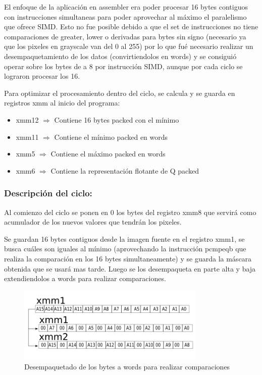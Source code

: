 El enfoque de la aplicación en assembler era poder procesar 16 bytes contiguos con instrucciones simultaneas para poder aprovechar al máximo el paralelismo que ofrece SIMD. Esto no fue posible debido a que el set de instrucciones no tiene comparaciones de greater, lower o derivadas para bytes sin signo (necesario ya que los pixeles en grayscale van del 0 al 255) por lo que fué necesario realizar un desempaquetamiento de los datos (convirtiendolos en words) y se consiguió operar sobre los bytes de a 8 por instrucción SIMD, aunque por cada ciclo se lograron procesar los 16.

Para optimizar el procesamiento dentro del ciclo, se calcula y se guarda en registros xmm al inicio del programa:
\begin{itemize}
  \item xmm12 $\Rightarrow$ Contiene 16 bytes packed con el mínimo
  \item xmm11 $\Rightarrow$ Contiene el mínimo packed en words
  \item xmm5 $\Rightarrow$ Contiene el máximo packed en words
  \item xmm6 $\Rightarrow$ Contiene la representación flotante de Q packed
\end{itemize}

\subsubsection{Descripción del ciclo:}
Al comienzo del ciclo se ponen en 0 los bytes del registro xmm8 que servirá como acumulador de los nuevos valores que tendrán los pixeles.

Se guardan 16 bytes contiguos desde la imagen fuente en el registro xmm1, se busca cuáles son iguales al mínimo (aprovechando la instrucción pcmpeqb que realiza la comparación en los 16 bytes simultaneamente) y se guarda la máscara obtenida que se usará mas tarde. Luego se los desempaqueta en parte alta y baja extendiendolos a words para realizar comparaciones.

\begin{figure}[ht!]
\centering
\includegraphics[width=90mm]{unpackxmm1.png}
\caption{Desempaquetado de los bytes a words para realizar comparaciones}
\label{overflow}
\end{figure}

